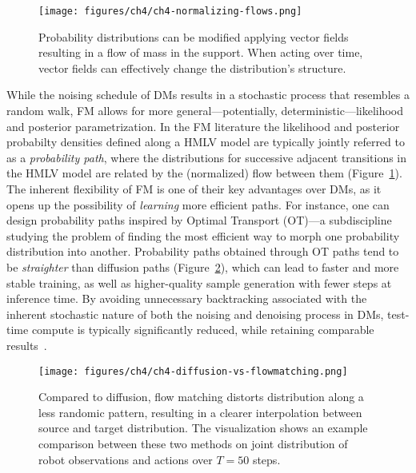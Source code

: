 \begin{figure}
    \centering
    \texttt{[image: figures/ch4/ch4-normalizing-flows.png]}
    \caption{Probability distributions can be modified applying vector fields resulting in a flow of mass in the support. When acting over time, vector fields can effectively change the distribution's structure.}
    \label{fig:ch4-normalizing-flows}
\end{figure}

While the noising schedule of DMs results in a stochastic process that resembles a random walk, FM allows for more general---potentially, deterministic---likelihood and posterior parametrization.
In the FM literature the likelihood and posterior probabilty densities defined along a HMLV model are typically jointly referred to as a \emph{probability path}, where the distributions for successive adjacent transitions in the HMLV model are related by the (normalized) flow between them (Figure~\ref{fig:ch4-normalizing-flows}).
The inherent flexibility of FM is one of their key advantages over DMs, as it opens up the possibility of \emph{learning} more efficient paths.
For instance, one can design probability paths inspired by Optimal Transport (OT)---a subdiscipline studying the problem of finding the most efficient way to morph one probability distribution into another.
Probability paths obtained through OT paths tend to be \emph{straighter} than diffusion paths (Figure~\ref{fig:ch4-diffusion-paths-versus-fm}), which can lead to faster and more stable training, as well as higher-quality sample generation with fewer steps at inference time.
By avoiding unnecessary backtracking associated with the inherent stochastic nature of both the noising and denoising process in DMs, test-time compute is typically significantly reduced, while retaining comparable results~\citep{lipmanFlowMatchingGenerative2023}.

\begin{figure}
    \centering
    \texttt{[image: figures/ch4/ch4-diffusion-vs-flowmatching.png]}
    \caption{Compared to diffusion, flow matching distorts distribution along a less randomic pattern, resulting in a clearer interpolation between source and target distribution. The visualization shows an example comparison between these two methods on joint distribution of robot observations and actions over \( T=50 \) steps.}
    \label{fig:ch4-diffusion-paths-versus-fm}
\end{figure}


